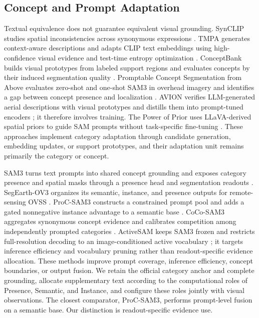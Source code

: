\subsection{Concept and Prompt Adaptation}

Textual equivalence does not guarantee equivalent visual grounding. SynCLIP studies spatial inconsistencies across synonymous expressions \cite{R20}. TMPA generates context-aware descriptions and adapts CLIP text embeddings using high-confidence visual evidence and test-time entropy optimization \cite{R08}. ConceptBank builds visual prototypes from labeled support regions and evaluates concepts by their induced segmentation quality \cite{R09}. Promptable Concept Segmentation from Above evaluates zero-shot and one-shot SAM3 in overhead imagery and identifies a gap between concept presence and localization \cite{R24}. AVION verifies LLM-generated aerial descriptions with visual prototypes and distills them into prompt-tuned encoders \cite{R50}; it therefore involves training. The Power of Prior uses LLaVA-derived spatial priors to guide SAM prompts without task-specific fine-tuning \cite{R51}. These approaches implement category adaptation through candidate generation, embedding updates, or support prototypes, and their adaptation unit remains primarily the category or concept.

SAM3 turns text prompts into shared concept grounding and exposes category presence and spatial masks through a presence head and segmentation readouts \cite{R10}. SegEarth-OV3 organizes its semantic, instance, and presence outputs for remote-sensing OVSS \cite{R11}. ProC-SAM3 constructs a constrained prompt pool and adds a gated nonnegative instance advantage to a semantic base \cite{R12}. CoCo-SAM3 aggregates synonymous concept evidence and calibrates competition among independently prompted categories \cite{R13}. ActiveSAM keeps SAM3 frozen and restricts full-resolution decoding to an image-conditioned active vocabulary \cite{R35}; it targets inference efficiency and vocabulary pruning rather than readout-specific evidence allocation. These methods improve prompt coverage, inference efficiency, concept boundaries, or output fusion. We retain the official category anchor and complete grounding, allocate supplementary text according to the computational roles of Presence, Semantic, and Instance, and configure these roles jointly with visual observations. The closest comparator, ProC-SAM3, performs prompt-level fusion on a semantic base. Our distinction is readout-specific evidence use.

